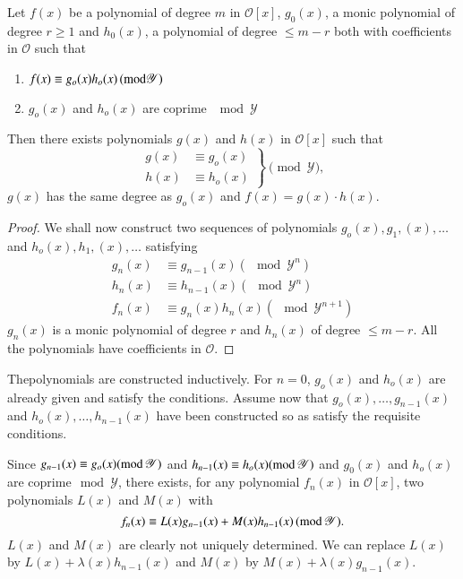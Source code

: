 \begin{lem}\label{chap8:lem2} %
Let $f(x)$ be a polynomial of degree $m$ in $\mathscr{O}[x]$, $g_0
(x)$,  a monic polynomial of degree $r \geq 1$ and $h_0 (x)$, a
polynomial of degree $\leq m - r$ both with coefficients in
$\mathscr{O}$ such that  
\begin{enumerate} [ 1)]
\item $f(x) \equiv g_o (x) h_o (x) \, ({\rm mod} \mathscr{Y})$

\item $g_o (x)$ and  $h_o (x) $ are coprime $\mod \mathscr{Y}$
\end{enumerate}

Then there exists polynomials $g(x)$ and $h(x)$ in
  $\mathscr{O} [x]$ such that
\begin{equation*}
\left.
\begin{aligned}
g(x)  & \equiv g_o (x)  \\
h(x)  & \equiv h_o (x) 
\end{aligned}
\right \} \pmod{\mathscr{Y}},
\end{equation*}
$g(x)$ has the same degree as $g_o (x)$ and $f(x) =
g(x) \cdot  h(x)$. 
\end{lem}

\begin{proof}
We shall now construct two sequences of polynomials \break $g_o (x), g_1,
(x), \ldots $ and $h_o (x), h_1, (x), \ldots $ satisfying  
\begin{align*}
g_n (x) & \equiv g_{n - 1}(x) (\mod \mathscr{Y}^n )\\
h_n (x) & \equiv h_{n - 1}(x) (\mod \mathscr{Y}^n )\\
f_n (x) & \equiv g_{n}(x) h_{n }(x) (\mod \mathscr{Y}^{n + 1} )
\end{align*}
$g_n (x)$ is a monic polynomial of degree $r$ and $h_n (x)$ of degree
$ \leq m - r$. All the polynomials have coefficients in $\mathscr{O}$.  
\end{proof}

The\pageoriginale polynomials are constructed inductively. For $ n =
0$, $ g_o (x)$ and $h_o (x)$ are already given and satisfy the
conditions. Assume now that $g_ o (x) , \ldots , g_{n - 1} (x)$ and
$h_ o (x) , \ldots , h_{n - 1} (x)$ have been constructed so as
satisfy the requisite conditions.  

Since  $g_{ n - 1}(x) \equiv g_o (x)({\rm mod} \, \mathscr{Y})$ and $h_{ n -
  1}(x) \equiv h_o (x)({\rm mod} \, \mathscr{Y})$ and $g_0 (x)$ and
$h_o (x)$ are 
coprime$\mod \mathscr{Y}$, there exists, for any polynomial $f_n
(x)$ in $\mathscr{O} [x]$, two polynomials $L(x)$ and $M(x)$ with  
$$
f_n (x) \equiv L(x) g_{n-1} (x) + M(x) h_{ n -1} (x) \, ({\rm mod } \, 
\mathscr{Y}).  
$$
$L(x) $ and $M(x)$ are clearly not uniquely determined. We can replace
$L(x)$ by $L(x)+ \lambda (x) h_{ n- 1} (x)$ and $M(x)$  by $M(x) +
\lambda (x) g_{n- 1} (x)$.  


